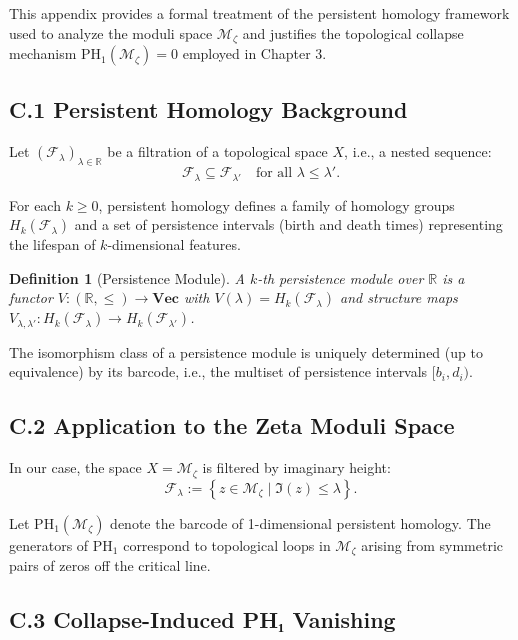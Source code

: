 \documentclass[11pt]{article}
\newtheorem{definition}[theorem]{Definition}
\begin{document}
This appendix provides a formal treatment of the persistent homology framework used to analyze the moduli space $\mathcal{M}_\zeta$  
and justifies the topological collapse mechanism $\mathrm{PH}_1(\mathcal{M}_\zeta) = 0$ employed in Chapter 3.

\subsection*{C.1 Persistent Homology Background}

Let $(\mathcal{F}_\lambda)_{\lambda \in \mathbb{R}}$ be a filtration of a topological space $X$, i.e., a nested sequence:
\[
\mathcal{F}_\lambda \subseteq \mathcal{F}_{\lambda'} \quad \text{for all } \lambda \leq \lambda'.
\]

For each $k \geq 0$, persistent homology defines a family of homology groups $H_k(\mathcal{F}_\lambda)$  
and a set of persistence intervals (birth and death times) representing the lifespan of $k$-dimensional features.

\begin{definition}[Persistence Module]
A $k$-th persistence module over $\mathbb{R}$ is a functor $V : (\mathbb{R}, \leq) \to \textbf{Vec}$  
with $V(\lambda) = H_k(\mathcal{F}_\lambda)$ and structure maps $V_{\lambda,\lambda'} : H_k(\mathcal{F}_\lambda) \to H_k(\mathcal{F}_{\lambda'})$.
\end{definition}

The isomorphism class of a persistence module is uniquely determined (up to equivalence) by its barcode,  
i.e., the multiset of persistence intervals $[b_i, d_i)$.

\subsection*{C.2 Application to the Zeta Moduli Space}

In our case, the space $X = \mathcal{M}_\zeta$ is filtered by imaginary height:
\[
\mathcal{F}_\lambda := \left\{ z \in \mathcal{M}_\zeta \mid \Im(z) \leq \lambda \right\}.
\]

Let $\mathrm{PH}_1(\mathcal{M}_\zeta)$ denote the barcode of 1-dimensional persistent homology.  
The generators of $\mathrm{PH}_1$ correspond to topological loops in $\mathcal{M}_\zeta$ arising from symmetric pairs of zeros  
off the critical line.

\subsection*{C.3 Collapse-Induced PH₁ Vanishing}
\end{document}
